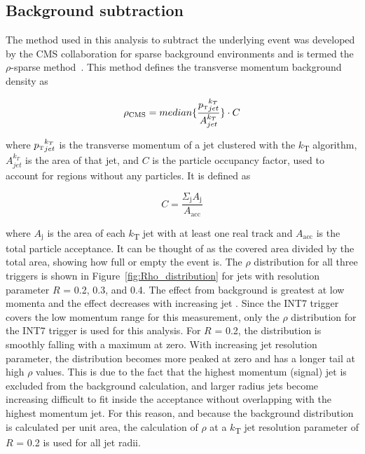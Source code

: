 \subsection{Background subtraction}
\label{sec:backgroundSubtraction}

The method used in this analysis to subtract the underlying event was developed by the CMS collaboration for sparse background environments and is termed the $\rho$-sparse method~\cite{CMS:2012rmf}. This method defines the transverse momentum background density as 

\begin{equation}
    \rho_{\text{CMS}} = median\{\frac{{\text{$p_{\mbox{\tiny T}}$}}_{jet}^{k_T}}{A_{jet}^{k_T}}\} \cdot C
\end{equation}

\noindent
where ${\text{$p_{\mbox{\tiny T}}$}}_{jet}^{k_T}$ is the transverse momentum of a jet clustered with the $k$\textsubscript{T} algorithm, $A_{jet}^{k_T}$ is the area of that jet, and $C$ is the particle occupancy factor, used to account for regions without any particles. It is defined as

\begin{equation}
    C = \frac{\Sigma_{\text{j}}A_{\text{j}}}{A_{\text{acc}}}
\end{equation}

\noindent
where $A_\text{j}$ is the area of each $k$\textsubscript{T} jet with at least one real track and $A_{\text{acc}}$ is the total particle acceptance. It can be thought of as the covered area divided by the total area, showing how full or empty the event is. The $\rho$ distribution for all three triggers is shown in Figure~\ref{fig:Rho_distribution} for jets with resolution parameter $R$ = 0.2, 0.3, and 0.4. The effect from background is greatest at low momenta and the effect decreases with increasing jet \pT. Since the INT7 trigger covers the low momentum range for this measurement, only the $\rho$ distribution for the INT7 trigger is used for this analysis. For $R$ = 0.2, the distribution is smoothly falling with a maximum at zero. With increasing jet resolution parameter, the distribution becomes more peaked at zero and has a longer tail at high $\rho$ values. This is due to the fact that the highest momentum (signal) jet is excluded from the background calculation, and larger radius jets become increasing difficult to fit inside the acceptance without overlapping with the highest momentum jet. For this reason, and because the background distribution is calculated per unit area, the calculation of $\rho$ at a $k$\textsubscript{T} jet resolution parameter of $R$ = 0.2 is used for all jet radii.

